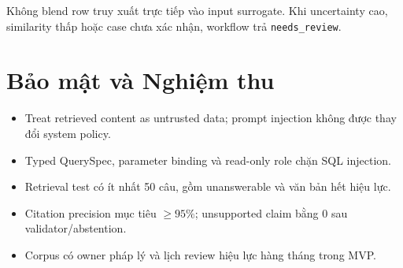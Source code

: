 \begin{tcolorbox}[dangerbox]
Không blend row truy xuất trực tiếp vào input surrogate. Khi uncertainty cao, similarity thấp hoặc case chưa xác nhận, workflow trả \texttt{needs\_review}.
\end{tcolorbox}

\section{Bảo mật và Nghiệm thu}

\begin{itemize}[itemsep=3pt]
  \item Treat retrieved content as untrusted data; prompt injection không được thay đổi system policy.
  \item Typed QuerySpec, parameter binding và read-only role chặn SQL injection.
  \item Retrieval test có ít nhất 50 câu, gồm unanswerable và văn bản hết hiệu lực.
  \item Citation precision mục tiêu $\geq95\%$; unsupported claim bằng 0 sau validator/abstention.
  \item Corpus có owner pháp lý và lịch review hiệu lực hàng tháng trong MVP.
\end{itemize}
